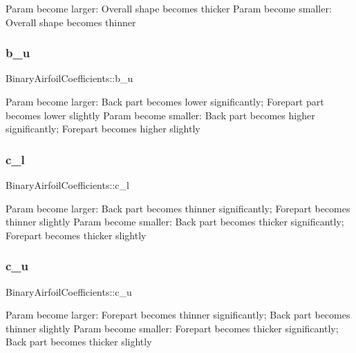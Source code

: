 Param become larger\+: Overall shape becomes thicker Param become smaller\+: Overall shape becomes thinner \mbox{\label{struct_binary_airfoil_coefficients_adadc9038b8731917b4dbcabd776b6627}} 
\subsubsection{\texorpdfstring{b\+\_\+u}{b\_u}}
{\footnotesize\ttfamily Binary\+Airfoil\+Coefficients\+::b\+\_\+u}

Param become larger\+: Back part becomes lower significantly; Forepart part becomes lower slightly Param become smaller\+: Back part becomes higher significantly; Forepart becomes higher slightly \mbox{\label{struct_binary_airfoil_coefficients_a0c5c811277770502ff707312b5289601}} 
\subsubsection{\texorpdfstring{c\+\_\+l}{c\_l}}
{\footnotesize\ttfamily Binary\+Airfoil\+Coefficients\+::c\+\_\+l}

Param become larger\+: Back part becomes thinner significantly; Forepart becomes thinner slightly Param become smaller\+: Back part becomes thicker significantly; Forepart becomes thicker slightly \mbox{\label{struct_binary_airfoil_coefficients_a9de0fabddae28b4d649a256c19137eb4}} 
\subsubsection{\texorpdfstring{c\+\_\+u}{c\_u}}
{\footnotesize\ttfamily Binary\+Airfoil\+Coefficients\+::c\+\_\+u}

Param become larger\+: Forepart becomes thinner significantly; Back part becomes thinner slightly Param become smaller\+: Forepart becomes thicker significantly; Back part becomes thicker slightly \mbox{\label{struct_binary_airfoil_coefficients_a8b911d241a95f63e79813747ba2c25e6}} 
